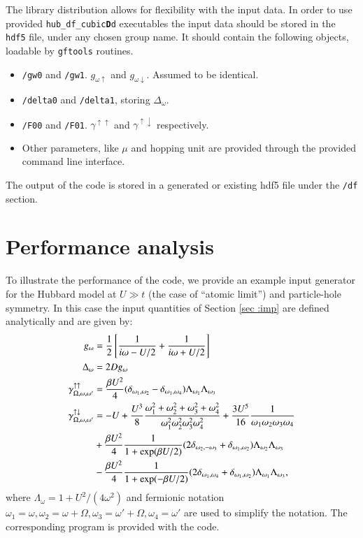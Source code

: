 \documentclass[3p,times,procedia]{elsarticle}
\begin{document}
The library distribution allows for flexibility with the input data. In order to use provided \texttt{hub\_df\_cubic{\bf D}d} executables the input data should be stored in the \texttt{hdf5} file, under any chosen group name. It should contain the following objects, loadable by \texttt{gftools} routines. 
\begin{itemize}
\item \texttt{/gw0} and \texttt{/gw1}. $g_{\omega \uparrow}$ and $g_{\omega \downarrow}$.  Assumed to be identical.
\item \texttt{/delta0} and \texttt{/delta1}, storing $\Delta_\omega$.
\item \texttt{/F00} and \texttt{/F01}. $\gamma^{\uparrow\uparrow}$ and $\gamma^{\uparrow\downarrow}$ respectively.
\item Other parameters, like $\mu$ and hopping unit are provided through the provided command line interface.
\end{itemize}
The output of the code is stored in a generated or existing hdf5 file under the \texttt{/df} section.

\section{Performance analysis}
To illustrate the performance of the code, we provide an example input generator for the Hubbard model at $U \gg t$ (the case of  ``atomic limit'') and particle-hole symmetry. In this case the input quantities of Section \ref{sec :imp} are defined analytically and are given by:
\begin{align}\label{eq:atomic_limit1}
g_{\omega} & = \frac{1}{2}\left[\frac{1}{i\omega - U/2} + \frac{1}{i\omega + U/2}\right] \\
\Delta_{\omega} & = 2Dg_{\omega} \label{eq:atomic_limit2} \\ 
\gamma^{\uparrow\uparrow}_{\Omega,\omega,\omega'} & = \frac{\beta U^2}{4} (\delta_{\omega_1,\omega_2} - \delta_{\omega_1,\omega_4} ) \Lambda_{\omega_1}\Lambda_{\omega_3} \label{eq:atomic_limit3} \\ 
\label{eq:atomic_limit4}
\gamma^{\uparrow\downarrow}_{\Omega,\omega,\omega'} & = -U + 
\frac{U^3}{8}\frac{\omega_1^2 + \omega_2^2 + \omega_3^2 + \omega_4^2}{\omega_1^2\omega_2^2\omega_3^2\omega_4^2} + \frac{3U^5}{16}\frac{1}{\omega_1\omega_2\omega_3\omega_4}  \\
& \notag + \frac{\beta U^2}{4} \frac{1}{1 + \exp(\beta U /2 )} 
(2\delta_{ \omega_2, -\omega_3} + \delta_{\omega_1, \omega_2}) 
\Lambda_{\omega_2} \Lambda_{\omega_3}  \\ 
& \notag - \frac{\beta U^2}{4} \frac{1}{1 + \exp(-\beta U /2 )} 
(2\delta_{ \omega_1, \omega_4} + \delta_{\omega_1, \omega_2}) 
\Lambda_{\omega_1} \Lambda_{\omega_3},
\end{align}
where $\Lambda_\omega = 1 + U^2/(4\omega^2)$ and fermionic notation $\omega_1 = \omega, \omega_2 = \omega + \Omega, \omega_3 = \omega' + \Omega, \omega_4 = \omega'$ are used to simplify the notation. The corresponding program is provided with the code. 
\end{document}
